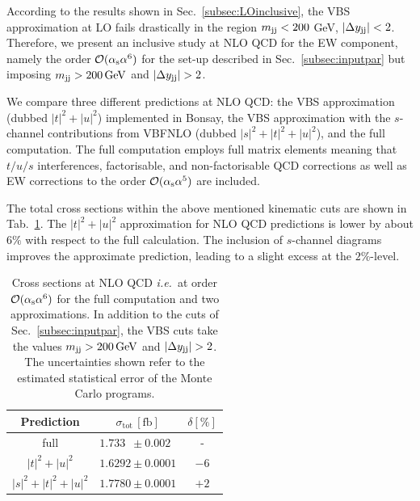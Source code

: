 According to the results shown in Sec.~\ref{subsec:LOinclusive}, the VBS approximation at LO fails drastically in the region $m_{\text{j}\text{j}} < 200$ GeV, $|\Delta y_{\text{j}\text{j}}| < 2$.
Therefore, we present an inclusive study at NLO QCD for the EW component, namely the order $\mathcal{O}(\alpha_\text{s}\alpha^6)$ for the set-up described in Sec.~\ref{subsec:inputpar} but imposing $m_{\text{j}\text{j}}>200 \,\text{GeV}$ and $|\Delta y_{\Pj\Pj}|>2$.



We compare three different predictions at NLO QCD: 
the VBS approximation (dubbed $|t|^2+|u|^2$) implemented in {\sc Bonsay}, the VBS approximation with the $s$-channel contributions from {\sc VBFNLO} (dubbed $|s|^2+|t|^2+|u|^2$), and the full computation.
The full computation employs full matrix elements meaning that $t/u/s$ interferences, factorisable, and non-factorisable QCD corrections as well as EW corrections to the order $\mathcal{O}(\alpha_\text{s} \alpha^5)$ are included.

The total cross sections within the above mentioned kinematic cuts are shown in Tab.~\ref{tab:crosssecINCLUSIVE}.
The $|t|^2+|u|^2$ approximation for NLO QCD predictions is lower by about $6\%$ with respect to the full calculation.
The inclusion of $s$-channel diagrams improves the approximate prediction, leading to a slight excess at the $2\%$-level.

\begin{table}[h!]
\centering
\begin{tabular}{c|c|c}
Prediction & $\sigma_{\textrm{tot}}\,[\textrm{fb}]$ & $\delta [\%]$ \\
\hline
\hline
full &  $1.733\phantom{0} \pm 0.002\phantom{0}$ & - \\
\hline
$|t|^2 + |u|^2$ & $1.6292 \pm 0.0001$  &  $-6$ \\
\hline
$|s|^2 + |t|^2 + |u|^2$ & $1.7780 \pm 0.0001$  & $+2$
\end{tabular}
\caption{Cross sections at NLO QCD \emph{i.e.}\ at order $\mathcal{O}(\alpha_\text{s}\alpha^6)$ for the full computation and two approximations.
In addition to the cuts of Sec.~\ref{subsec:inputpar}, the VBS cuts take the values $m_{\text{j}\text{j}}>200 \,\text{GeV}$ and $|\Delta y_{\Pj\Pj}|>2$.
The uncertainties shown refer to the estimated statistical error of the Monte Carlo programs.}
\label{tab:crosssecINCLUSIVE}
\end{table}

